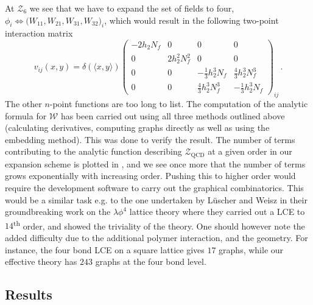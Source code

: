 %
At $\mathcal{Z}_6$ we see that we have to expand the set of fields to four,
$\phi_i \Leftrightarrow \big(W_{11}, W_{21}, W_{31}, W_{32}\big)_i$,
which would result in the following two-point interaction matrix
%
\begin{equation}
  v_{ij}(x,y) = \delta(\langle x,y \rangle)
    \begin{pmatrix}
      -2 h_2 N_f & 0 & 0 & 0\\
      0 & 2 h_2^2 N_f^2 & 0 & 0\\
      0 & 0 & -\textstyle\frac{1}{3} h_2^3 N_f & \textstyle\frac{4}{3} h_2^3 N_f^3\\
      0 & 0 & \textstyle\frac{4}{3} h_2^3 N_f^3 & -\textstyle\frac{1}{3} h_2^3 N_f
    \end{pmatrix}_{ij} \,.
\end{equation}
%
The other $n$-point functions are too long to list. The computation of the
analytic formula for $\mathcal{W}$ has been carried out using all three methods
outlined above (calculating derivatives, computing graphs directly as well as
using the embedding method). This was done to verify the result. The number of
terms contributing to the analytic function describing
$\mathcal{Z}_{\mathrm{QCD}}$ at a given order in our expansion scheme is plotted
in , and we see once more that the number of terms
grows exponentially with increasing order. Pushing this to higher order would
require the development software to carry out the graphical combinatorics.  This
would be a similar task e.g. to the one undertaken by L\"{u}scher and Weisz in
their groundbreaking work on the $\lambda \phi^4$ lattice theory
\citep{Luscher:1988gk,Luscher:1988uq} where they carried out a LCE to
$14$\textsuperscript{th} order, and showed the triviality of the theory.  One
should however note the added difficulty due to the additional polymer
interaction, and the geometry. For instance, the four bond LCE on a square
lattice gives $17$ graphs, while our effective theory has $243$ graphs at the
four bond level.

\subsection{Results} \label{sec:cluster_results}

